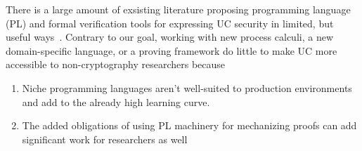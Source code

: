 %

There is a large amount of exsisting literature proposing programming language (PL) and formal verification tools for expressing UC security in limited, but useful ways~\cite{.}.
Contrary to our goal, working with new process calculi, a new domain-specific language, or a proving framework do little to make UC more accessible to non-cryptography researchers because 
\begin{enumerate}
\item Niche programming languages aren't well-suited to production environments and add to the already high learning curve.
\item The added obligations of using PL machinery for mechanizing proofs can add significant work for researchers as well~\cite{ironfleet,easycryptuc}  
\end{enumerate}

